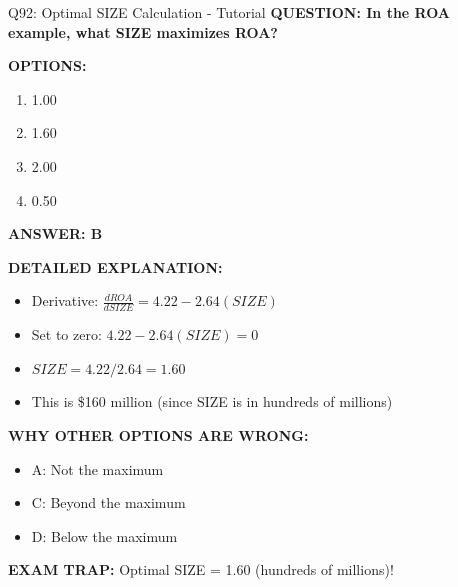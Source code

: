 \documentclass[8pt]{beamer}
\begin{document}
	\begin{frame}{Q92: Optimal SIZE Calculation - Tutorial}
		\fontsize{6.5}{7.5}\selectfont
		\textbf{QUESTION: In the ROA example, what SIZE maximizes ROA?}
		
		\vspace{0.1cm}
		\textbf{OPTIONS:}
		\begin{enumerate}
			\item 1.00
			\item 1.60
			\item 2.00
			\item 0.50
		\end{enumerate}
		
		\vspace{0.1cm}
		\textcolor{myblue}{\textbf{ANSWER: B}}
		
		\vspace{0.1cm}
		\textbf{DETAILED EXPLANATION:}
		\begin{itemize}
			\item Derivative: $\frac{dROA}{dSIZE} = 4.22 - 2.64(SIZE)$
			\item Set to zero: $4.22 - 2.64(SIZE) = 0$
			\item $SIZE = 4.22 / 2.64 = 1.60$
			\item This is \$160 million (since SIZE is in hundreds of millions)
		\end{itemize}
		
		\vspace{0.1cm}
		\textcolor{myred}{\textbf{WHY OTHER OPTIONS ARE WRONG:}}
		\begin{itemize}
			\item \textcolor{myred}{A:} Not the maximum
			\item \textcolor{myred}{C:} Beyond the maximum
			\item \textcolor{myred}{D:} Below the maximum
		\end{itemize}
		
		\textcolor{myred}{\textbf{EXAM TRAP:}} Optimal SIZE = \textcolor{myblue}{1.60} (hundreds of millions)!
	\end{frame}
	
\end{document}

